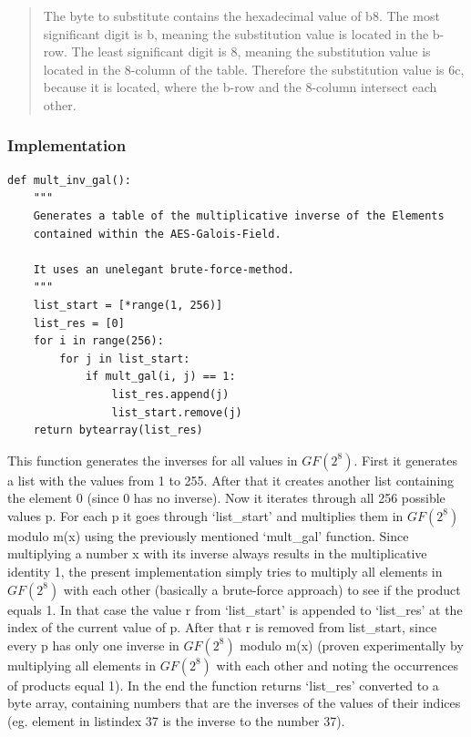 \begin{quote}
The byte to substitute contains the hexadecimal value of b8. The most
significant digit is b, meaning the substitution value is located in the
b-row. The least significant digit is 8, meaning the substitution value
is located in the 8-column of the table. Therefore the substitution
value is 6c, because it is located, where the b-row and the 8-column
intersect each other.
\end{quote}

\hypertarget{implementation-1}{%
\subsubsection{Implementation}\label{implementation-1}}

\begin{lstlisting}
def mult_inv_gal():
    """
    Generates a table of the multiplicative inverse of the Elements
    contained within the AES-Galois-Field.

    It uses an unelegant brute-force-method.
    """
    list_start = [*range(1, 256)]
    list_res = [0]
    for i in range(256):
        for j in list_start:
            if mult_gal(i, j) == 1:
                list_res.append(j)
                list_start.remove(j)
    return bytearray(list_res)
\end{lstlisting}

This function generates the inverses for all values in $GF(2^{8})$. First it
generates a list with the values from 1 to 255. After that it creates
another list containing the element 0 (since 0 has no inverse). Now it
iterates through all 256 possible values p. For each p it goes through
`list\_start' and multiplies them in $GF(2^{8})$ modulo m(x) using the
previously mentioned `mult\_gal' function. Since multiplying a number x
with its inverse always results in the multiplicative identity 1, the
present implementation simply tries to multiply all elements in $GF(2^{8})$
with each other (basically a brute-force approach) to see if the product
equals 1. In that case the value r from `list\_start' is appended to
`list\_res' at the index of the current value of p. After that r is
removed from list\_start, since every p has only one inverse in $GF(2^{8})$
modulo m(x) (proven experimentally by multiplying all elements in $GF(2^{8})$
with each other and noting the occurrences of products equal 1). In the
end the function returns `list\_res' converted to a byte array,
containing numbers that are the inverses of the values of their indices
(eg. element in listindex 37 is the inverse to the number 37).


